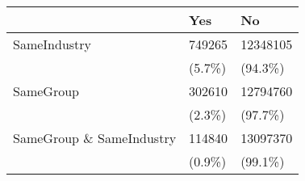\begin{tabular}{lll}
\toprule
{} &     Yes &        No \\
\midrule
SameIndustry             &  749265 &  12348105 \\
                         &  (5.7\%) &   (94.3\%) \\
SameGroup                &  302610 &  12794760 \\
                         &  (2.3\%) &   (97.7\%) \\
SameGroup \& SameIndustry &  114840 &  13097370 \\
                         &  (0.9\%) &   (99.1\%) \\
\bottomrule
\end{tabular}
